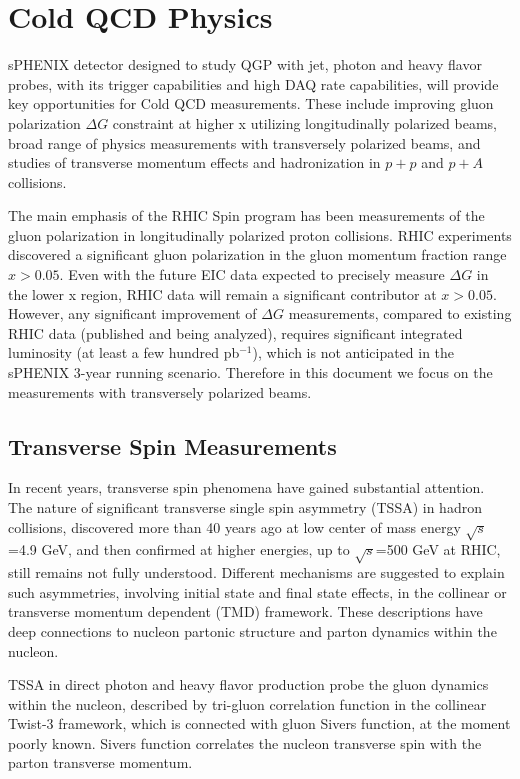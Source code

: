  





\section{Cold QCD Physics}
\label{sec:ColdQCD}

sPHENIX detector designed to study QGP with jet, photon and heavy flavor probes, with its trigger capabilities and high DAQ rate capabilities, will provide key opportunities for Cold QCD measurements. These include improving gluon polarization $\Delta G$ constraint at higher x utilizing longitudinally polarized beams, broad range of physics measurements with transversely polarized beams, and studies of transverse momentum effects and hadronization in $p+p$ and $p+A$ collisions.

The main emphasis of the RHIC Spin program has been measurements of the gluon polarization in longitudinally polarized proton collisions. RHIC experiments discovered a significant gluon polarization in the gluon momentum fraction range $x>0.05$. Even with the future EIC data expected to precisely measure $\Delta G$ in the lower x region, RHIC data will remain a significant contributor at $x>0.05$. However, any significant improvement of $\Delta G$ measurements, compared to existing RHIC data (published and being analyzed), requires significant integrated luminosity (at least a few hundred pb$^{-1}$), which is not anticipated in the sPHENIX 3-year running scenario. Therefore in this document we focus on the measurements with transversely polarized beams.

\subsection {Transverse Spin Measurements}

In recent years, transverse spin phenomena have gained substantial attention. The nature of significant transverse single spin asymmetry (TSSA) in hadron collisions, discovered more than 40 years ago at low center of mass energy $\sqrt{s}$=4.9 GeV, and then confirmed at higher energies, up to $\sqrt{s}$=500 GeV at RHIC, still remains not fully understood. Different mechanisms are suggested to explain such asymmetries, involving initial state and final state effects, in the collinear or transverse momentum dependent (TMD) framework. These descriptions have deep connections to nucleon partonic structure and parton dynamics within the nucleon.

TSSA in direct photon and heavy flavor production probe the gluon dynamics within the nucleon, described by tri-gluon correlation function in the collinear Twist-3 framework, which is connected with gluon Sivers function, at the moment poorly known. Sivers function correlates the nucleon transverse spin with the parton transverse momentum. 

